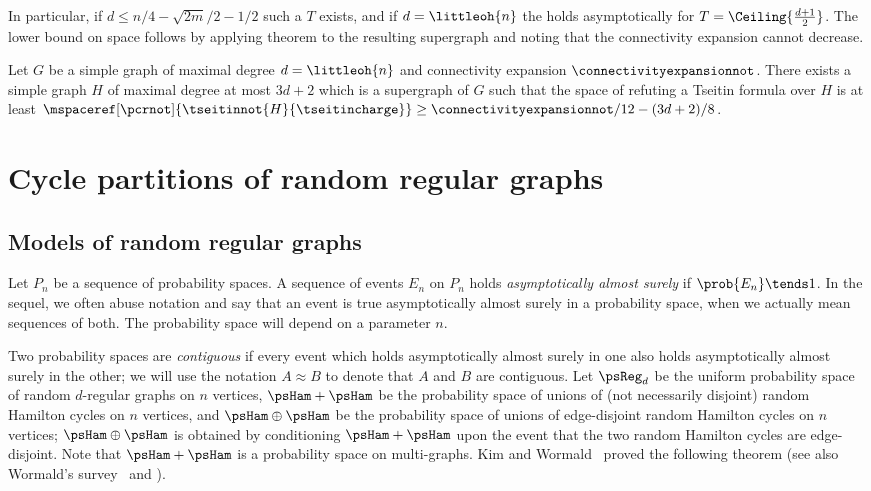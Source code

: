 \documentclass{toc}
\begin{document}
In particular, if $d\leq n/4-\sqrt{2 m}/2-1/2$ such a $T$ exists, and if $d=\littleoh{n}$ the  holds asymptotically for $T=\Ceiling{\frac{d+1}{2}}$. The lower bound on space follows by applying theorem  to the resulting supergraph and noting that the connectivity expansion cannot decrease.

\begin{theorem}
\label{th:triangulation}
Let $G$ be a simple graph of maximal degree $d=\littleoh{n}$ and connectivity expansion $\connectivityexpansionnot$. There exists a simple graph $H$ of maximal degree at most $3d+2$ which is a supergraph of $G$ such that the space of refuting a Tseitin formula over $H$ is at least $\mspaceref[\pcrnot]{\tseitinnot{H}{\tseitincharge}} \geq \connectivityexpansionnot/12-(3d+2)/8$.
\end{theorem}
\section{Cycle partitions of random regular graphs} 
\label{sec:cycle-partitions}

\subsection{Models of random regular graphs}
Let $P_n$ be a sequence of probability spaces. A sequence of events $E_n$ on $P_n$ holds \emph{asymptotically almost surely} if $\prob{E_n} \tends 1$. In the sequel, we often abuse notation and say that an event is true asymptotically almost surely in a probability space, when we actually mean sequences of both. The probability space will depend on a parameter $n$.

Two probability spaces are \emph{contiguous} if every event which holds asymptotically almost surely in one also holds asymptotically almost surely in the other; we will use the notation $A \approx B$ to denote that $A$ and $B$ are contiguous.
%
%
%
%
Let $\psReg_d$ be the uniform probability space of random $d$-regular graphs on $n$ vertices, $\psHam+\psHam$ be the probability space of unions of (not necessarily disjoint) random Hamilton cycles on $n$ vertices, and $\psHam \oplus \psHam$ be the probability space of unions of edge-disjoint random Hamilton cycles on $n$ vertices; $\psHam \oplus \psHam$ is obtained by conditioning $\psHam + \psHam$ upon the event that the two random Hamilton cycles are edge-disjoint. Note that $\psHam + \psHam$ is a probability space on multi-graphs. Kim and Wormald~\cite{KW} proved the following theorem (see also Wormald's survey~\cite{W} and \cite[\S 9.3--9.6]{JLR}).
\end{document}
